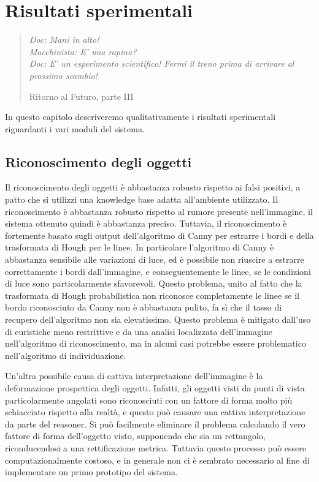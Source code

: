 \chapter{Risultati sperimentali}
\label{cap:risultati}
\thispagestyle{empty}

\begin{quotation}
{\footnotesize
\noindent\emph{Doc: Mani in alto! \\
Macchinista: E' una rapina? \\
Doc: E' un esperimento scientifico! Fermi il treno prima di arrivare al prossimo scambio!}
\begin{flushright}
Ritorno al Futuro, parte III
\end{flushright}
}
\end{quotation}
\vspace{0.5cm}

In questo capitolo descriveremo qualitativamente i risultati sperimentali riguardanti i vari moduli del sistema.

\section{Riconoscimento degli oggetti}
Il riconoscimento degli oggetti è abbastanza robusto rispetto ai falsi positivi, a patto che si utilizzi una knowledge base adatta all'ambiente utilizzato. Il riconoscimento è abbastanza robusto rispetto al rumore presente nell'immagine, il sistema ottenuto quindi è abbastanza preciso. 
Tuttavia, il riconoscimento è fortemente basato sugli output dell'algoritmo di Canny per estrarre i bordi e della trasformata di Hough per le linee. In particolare l'algoritmo di Canny è abbastanza sensibile alle variazioni di luce, ed è possibile non riuscire a estrarre correttamente i bordi dall'immagine, e conseguentemente le linee, se le condizioni di luce sono particolarmente sfavorevoli. Questo problema, unito al fatto che la trasformata di Hough probabilistica non riconosce completamente le linee se il bordo riconosciuto da Canny non è abbastanza pulito, fa sì che il tasso di recupero dell'algoritmo non sia elevatissimo. Questo problema è mitigato dall'uso di euristiche meno restrittive e da una analisi localizzata dell'immagine nell'algoritmo di riconoscimento, ma in alcuni casi potrebbe essere problematico nell'algoritmo di individuazione. 

Un'altra possibile causa di cattiva interpretazione dell'immagine è la deformazione prospettica degli oggetti. Infatti, gli oggetti visti da punti di vista particolarmente angolati sono riconosciuti con un fattore di forma molto più schiacciato rispetto alla realtà, e questo può causare una cattiva interpretazione da parte del reasoner. Si può facilmente eliminare il problema calcolando il vero fattore di forma dell'oggetto visto, supponendo che sia un rettangolo, riconducendosi a una rettificazione metrica. Tuttavia questo processo può essere computazionalmente costoso, e in generale non ci è sembrato necessario al fine di implementare un primo prototipo del sistema.

